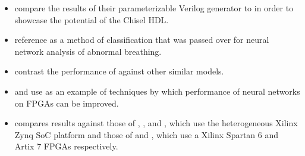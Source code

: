 \documentclass[12pt,letterpaper,english]{article}
\newcommand{\citework}[1]{\citeauthor{#1} \autocite{#1}}
\newcommand{\citeworks}[2]{%
	\citeauthor*{#1} \autocite{#1} and \citeauthor*{#2} \autocite{#2}%
}
\newcommand{\citemoreworks}[3]{%
	\citeauthor*{#1} \autocite{#1},
	\citeauthor*{#2} \autocite{#2}, and
	\citeauthor*{#3} \autocite{#3}%
}
\begin{document}
\begin{itemize}
	\item \citework{madineni2023parameterizable} compare the results of their
	parameterizable Verilog generator to  in order to showcase
	the potential of the Chisel HDL.
	\item \citework{baedorf2023reverse} reference  as a method
	of classification that was passed over for neural network analysis of
	abnormal breathing.
	\item \citework{phipps2023pre} contrast the performance of 
	against other similar models.
	\item \citeworks{pistellato2023quantization}{yan2023end} use
	 as an example of techniques by which performance of neural
	networks on FPGAs can be improved.
	\item \citeauthor{main} compares results against those of
	\citemoreworks{yaozong2019design}{xiaokang2019design}{binfeng2019design},
	which use the heterogeneous Xilinx Zynq SoC platform and those of
	\citeworks{bingchen2019fpga}{hui2021convolutional},
	which use a Xilinx Spartan 6 and Artix 7 FPGAs respectively.
\end{itemize}


\newpage
\printbibliography
\end{document}
